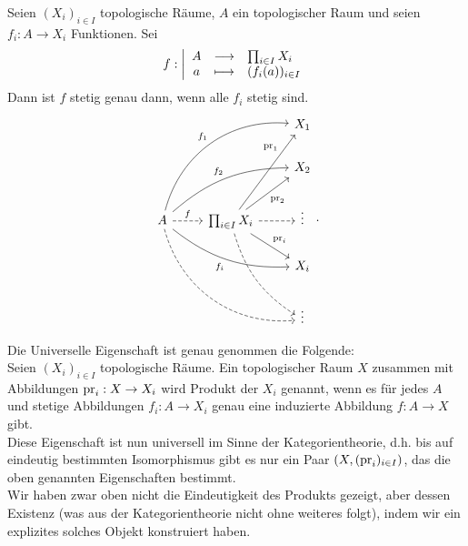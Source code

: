 
\begin{theorem}\label{thm:universelle-eigenschaft-des-produkts}
    Seien $(X_i)_{i\in I}$ topologische Räume, $A$ ein topologischer Raum und seien $f_i : A \to  X_i$ Funktionen. Sei
        \begin{equation*}
        f: \left| \begin{array}{c c l} 
        A & \longrightarrow & \prod_{i \in I} X_i \\
        a & \longmapsto &  (f_i(a))_{i \in I}
        \end{array} \right.
    \end{equation*}
    Dann ist $f$ stetig genau dann, wenn alle  $f_i$ stetig sind.
    \[
    \begin{tikzcd}
        & & X_1 \\
        & & X_2 \\
    A \ar[dashed]{r}{f} \ar[bend left = 40]{uurr}{f_1} \ar[bend left = 20]{urr}{f_2} \ar[bend right = 20,swap]{drr}{f_i} \ar[dashed, bend right = 40]{ddrr}& \prod_{i \in I}X_i \ar[near end]{uru}{\pr_1} \ar[swap]{ur}{\pr_2} \ar{dr}{\pr_i} \ar[bend right = 20,dashed]{ddr} \ar[dashed]{r}& \vdots \\
          & & X_i \\
          & & \vdots
    \end{tikzcd}
    .\] 
\end{theorem}
\begin{remark*}
    Die Universelle Eigenschaft ist genau genommen die Folgende: \\
    Seien $(X_i)_{i \in I}$ topologische Räume. Ein topologischer Raum $X$  zusammen mit Abbildungen  $\operatorname{pr}_i : X \to  X_i$ wird Produkt der $X_i$ genannt, wenn es für jedes  $A$ und stetige Abbildungen  $f_i : A \to  X_i$ genau eine induzierte Abbildung $f: A \to  X$ gibt. \\
    Diese Eigenschaft ist nun universell im Sinne der Kategorientheorie, d.h. bis auf eindeutig bestimmten Isomorphismus gibt es nur ein Paar $(X, (\operatorname{pr}_i)_{i \in I})$, das die oben genannten Eigenschaften bestimmt. \\
    Wir haben zwar oben nicht die Eindeutigkeit des Produkts gezeigt, aber dessen Existenz (was aus der Kategorientheorie nicht ohne weiteres folgt), indem wir ein explizites solches Objekt konstruiert haben.
\end{remark*}
